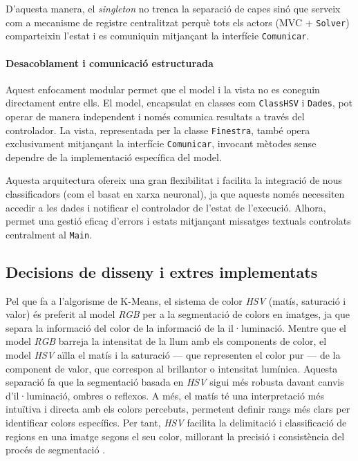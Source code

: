 \documentclass{ieeetj}
\begin{document}
D’aquesta manera, el \emph{singleton} no trenca la separació de capes sinó que
serveix com a mecanisme de registre centralitzat perquè tots els actors
(MVC + \texttt{Solver}) comparteixin l’estat i es comuniquin mitjançant la
interfície \texttt{Comunicar}.


\paragraph{Desacoblament i comunicació estructurada}

Aquest enfocament modular permet que el model i la vista no es coneguin directament entre ells. El model, encapsulat en classes com \texttt{ClassHSV} i \texttt{Dades}, pot operar de manera independent i només comunica resultats a través del controlador. \newline
La vista, representada per la classe \texttt{Finestra}, també opera exclusivament mitjançant la interfície \texttt{Comunicar}, invocant mètodes sense dependre de la implementació específica del model.\newline

Aquesta arquitectura ofereix una gran flexibilitat i facilita la integració de nous classificadors (com el basat en xarxa neuronal), ja que aquests només necessiten accedir a les dades i notificar el controlador de l'estat de l'execució. Alhora, permet una gestió eficaç d'errors i estats mitjançant missatges textuals controlats centralment al \texttt{Main}.


\subsection{Decisions de disseny i extres implementats}
Pel que fa a l'algorisme de K-Means, el sistema de color \emph{HSV} (matís, saturació i valor) és preferit al model \emph{RGB} per a la segmentació de colors en imatges, ja que separa la informació del color de la informació de la il·luminació. Mentre que el model \emph{RGB} barreja la intensitat de la llum amb els components de color, el model \emph{HSV} aïlla el matís i la saturació — que representen el color pur — de la component de valor, que correspon al brillantor o intensitat lumínica. Aquesta separació fa que la segmentació basada en \emph{HSV} sigui més robusta davant canvis d'il·luminació, ombres o reflexos. A més, el matís té una interpretació més intuïtiva i directa amb els colors percebuts, permetent definir rangs més clars per identificar colors específics. Per tant, \emph{HSV} facilita la delimitació i classificació de regions en una imatge segons el seu color, millorant la precisió i consistència del procés de segmentació \cite{colorSegmentation2018} \cite{stackOverflowKMeans}.
\end{document}
